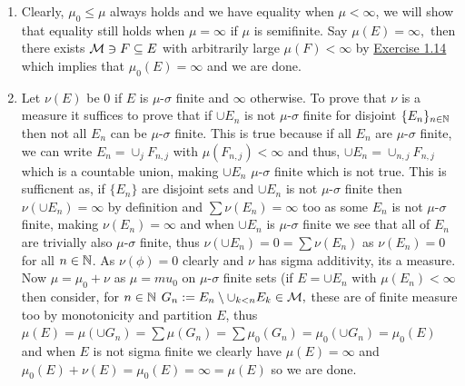 \documentclass[12pt,a4paper]{article}
\begin{document}
\begin{solution}
\begin{enumerate}[label=\alph*.]
        \item Clearly, $\mu_0\leq\mu$ always holds and we have equality when $\mu<\infty$, we will show that equality still holds when $\mu=\infty$ if $\mu$ is semifinite. 
        Say $\mu(E)=\infty,$ then there exists $\mathcal{M}\ni F\subseteq E$ with arbitrarily large $\mu(F)<\infty$ by \hyperref[prob:1-14]{Exercise 1.14} which implies that $\mu_0(E)=\infty$ and we are done.
        \item Let $\nu(E)$ be $0$ if $E$ is $\mu\text{-}\sigma$ finite and $\infty$ otherwise. To prove that $\nu$ is a measure it suffices to prove that if $\cup E_n$ is not $\mu\text{-}\sigma$ finite for disjoint $\{E_n\}_{n\in\mathbb{N}}$ then not all $E_n$ can be $\mu\text{-}\sigma$ finite. 
        This is true because if all $E_n$ are $\mu\text{-}\sigma$ finite, we can write $E_n=\cup_j F_{n,j}$ with $\mu(F_{n,j})<\infty$ and thus, $\cup E_n=\cup_{n,j} F_{n,j}$ which is a countable union, making $\cup E_n$ $\mu\text{-}\sigma$ finite which is not true.
        This is sufficnent as, if $\{E_n\}$ are disjoint sets and $\cup E_n$ is not $\mu\text{-}\sigma$ finite then $\nu(\cup E_n)=\infty$ by definition and $\sum\nu(E_n)=\infty$ too as some $E_n$ is not $\mu\text{-}\sigma$ finite, making $\nu(E_n)=\infty$ and when $\cup E_n$ is $\mu\text{-}\sigma$ finite we see that all of $E_n$ are trivially also $\mu\text{-}\sigma$ finite, thus $\nu(\cup E_n)=0=\sum\nu(E_n)$ as $\nu(E_n)=0$ for all $n\in\mathbb{N}$. As $\nu(\phi)=0$ clearly and $\nu$ has sigma additivity, its a measure.
        Now $\mu=\mu_0+\nu$ as $\mu=mu_0$ on $\mu\text{-}\sigma$ finite sets (if $E=\cup E_n$ with $\mu(E_n)<\infty$ then consider, for $n\in\mathbb{N}$ $G_n:=E_n\setminus\cup_{k<n}E_k\in\mathcal{M},$ these are of finite measure too by monotonicity and partition $E$, thus $\mu(E)=\mu(\cup G_n)=\sum\mu(G_n)=\sum\mu_0(G_n)=\mu_0(\cup G_n)=\mu_0(E)$ and when $E$ is not sigma finite we clearly have $\mu(E)=\infty$ and $\mu_0(E)+\nu(E)=\mu_0(E)=\infty=\mu(E)$ so we are done.
\end{enumerate}
\end{solution}
\end{document}

